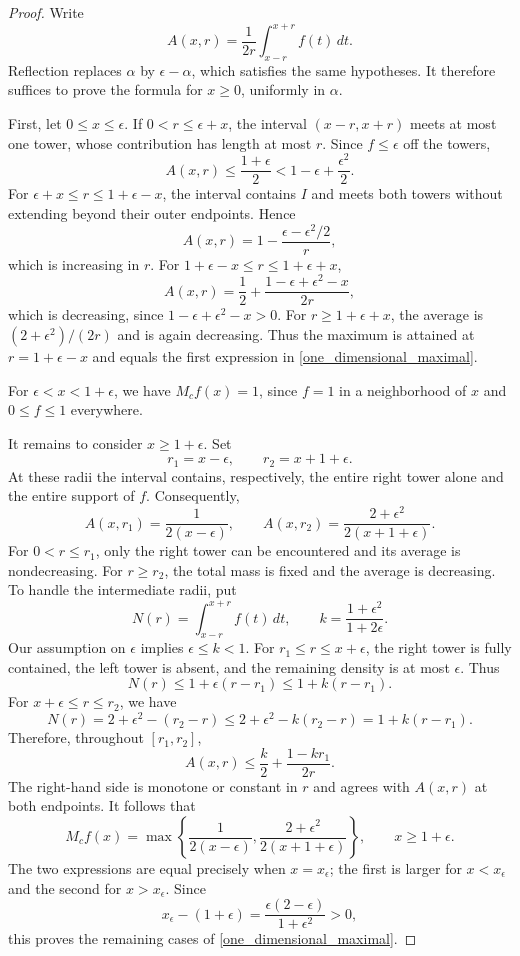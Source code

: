\documentclass[12pt]{amsart}
\numberwithin{equation}{section}
\begin{document}
\begin{proof}
Write
\[
A(x,r)=\frac{1}{2r}\int_{x-r}^{x+r}f(t)\,dt.
\]
Reflection replaces $\alpha$ by $\epsilon-\alpha$, which satisfies the
same hypotheses. It therefore suffices to prove the formula for $x\geq0$,
uniformly in $\alpha$.

First, let $0\leq x\leq\epsilon$. If $0<r\leq\epsilon+x$, the
interval $(x-r,x+r)$ meets at most one tower, whose contribution has
length at most $r$. Since $f\leq\epsilon$ off the towers,
\[
A(x,r)\leq\frac{1+\epsilon}{2}
<1-\epsilon+\frac{\epsilon^2}{2}.
\]
For $\epsilon+x\leq r\leq1+\epsilon-x$, the interval contains $I$
and meets both towers without extending beyond their outer endpoints.
Hence
\[
A(x,r)=1-\frac{\epsilon-\epsilon^2/2}{r},
\]
which is increasing in $r$. For $1+\epsilon-x\leq r\leq1+\epsilon+x$,
\[
A(x,r)=\frac12+\frac{1-\epsilon+\epsilon^2-x}{2r},
\]
which is decreasing, since $1-\epsilon+\epsilon^2-x>0$.
For $r\geq1+\epsilon+x$, the average is $(2+\epsilon^2)/(2r)$ and
is again decreasing. Thus the maximum is attained at $r=1+\epsilon-x$
and equals the first expression in \eqref{one_dimensional_maximal}.

For $\epsilon<x<1+\epsilon$, we have $M_cf(x)=1$, since $f=1$ in a
neighborhood of $x$ and $0\leq f\leq1$ everywhere.

It remains to consider $x\geq1+\epsilon$. Set
\[
r_1=x-\epsilon,\qquad r_2=x+1+\epsilon.
\]
At these radii the interval contains, respectively, the entire right
tower alone and the entire support of $f$. Consequently,
\[
A(x,r_1)=\frac{1}{2(x-\epsilon)},\qquad
A(x,r_2)=\frac{2+\epsilon^2}{2(x+1+\epsilon)}.
\]
For $0<r\leq r_1$, only the right tower can be encountered and its
average is nondecreasing. For $r\geq r_2$, the total mass is fixed and
the average is decreasing. To handle the intermediate radii, put
\[
N(r)=\int_{x-r}^{x+r}f(t)\,dt,
\qquad k=\frac{1+\epsilon^2}{1+2\epsilon}.
\]
Our assumption on $\epsilon$ implies $\epsilon\leq k<1$.
For $r_1\leq r\leq x+\epsilon$, the right tower is fully contained,
the left tower is absent, and the remaining density is at most $\epsilon$.
Thus
\[
N(r)\leq1+\epsilon(r-r_1)\leq1+k(r-r_1).
\]
For $x+\epsilon\leq r\leq r_2$, we have
\[
N(r)=2+\epsilon^2-(r_2-r)
\leq2+\epsilon^2-k(r_2-r)=1+k(r-r_1).
\]
Therefore, throughout $[r_1,r_2]$,
\[
A(x,r)\leq\frac{k}{2}+\frac{1-kr_1}{2r}.
\]
The right-hand side is monotone or constant in $r$ and agrees with
$A(x,r)$ at both endpoints. It follows that
\begin{equation}
\label{one_dimensional_maximal_exterior}
M_cf(x)=\max\left\{
\frac{1}{2(x-\epsilon)},
\frac{2+\epsilon^2}{2(x+1+\epsilon)}
\right\},\qquad x\geq1+\epsilon.
\end{equation}
The two expressions are equal precisely when $x=x_\epsilon$; the first
is larger for $x<x_\epsilon$ and the second for $x>x_\epsilon$.
Since
\[
x_\epsilon-(1+\epsilon)
=\frac{\epsilon(2-\epsilon)}{1+\epsilon^2}>0,
\]
this proves the remaining cases of \eqref{one_dimensional_maximal}.
\end{proof}
\end{document}
